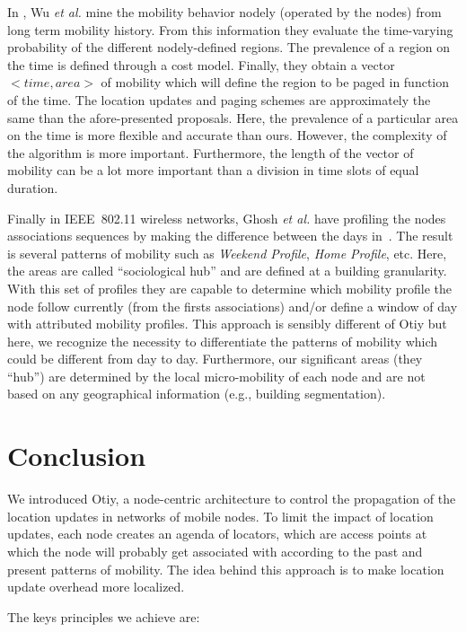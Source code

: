 \documentclass[a4paper]{sig-alternate-10pt}
\begin{document}
In \cite{wu01personal}, Wu \textit{et al.} mine the mobility
behavior nodely (operated by the nodes) from long term
mobility history. From this information they evaluate the
time-varying probability of the different nodely-defined
regions. The prevalence of a region on the time is defined through a
cost model. Finally, they obtain a vector $<time,area>$ of mobility
which will define the region to be paged in function of the time.
The location updates and paging schemes are approximately the same
than the afore-presented proposals. Here, the prevalence of a
particular area on the time is more flexible and accurate than ours.
However, the complexity of the algorithm is more important.
Furthermore, the length of the vector of mobility can be a lot more
important than a division in time slots of equal duration.

Finally in IEEE~802.11 wireless networks, Ghosh \textit{et al.} have
profiling the nodes associations sequences by making the difference
between the days in~\cite{ghosh_profiling}. The result is several
patterns of mobility such as \textit{Weekend Profile}, \textit{Home
Profile}, etc. Here, the areas are called ``sociological hub'' and
are defined at a building granularity. With this set of profiles
they are capable to determine which mobility profile the node follow
currently (from the firsts associations) and/or define a window of
day with attributed mobility profiles. This approach is sensibly
different of Otiy but here, we recognize the necessity to
differentiate the patterns of mobility which could be different from
day to day. Furthermore, our significant areas (they ``hub'') are
determined by the local micro-mobility of each node and are
not based on any geographical information (e.g., building
segmentation).


\section{Conclusion}
\label{sec:conclusion}

We introduced Otiy, a node-centric architecture to control the
propagation of the location updates in networks of mobile nodes. To
limit the impact of location updates, each node creates an
agenda of locators, which are access points at which the node will
probably get associated with according to the past and present
patterns of mobility. The idea behind this approach is to make
location update overhead more localized.

The keys principles we achieve are:
\end{document}
